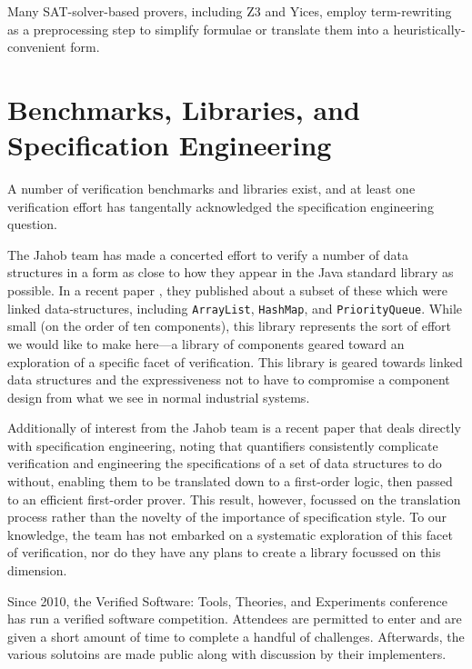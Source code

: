 Many SAT-solver-based provers, including Z3 and Yices, employ term-rewriting as a preprocessing step to simplify formulae or translate them into a heuristically-convenient form.

\section{Benchmarks, Libraries, and Specification Engineering}\label{sec:overviewEngineering}
A number of verification benchmarks and libraries exist, and at least one verification effort has tangentally acknowledged the specification engineering question.

The Jahob team has made a concerted effort to verify a number of data structures in a form as close to how they appear in the Java standard library as possible.  In a recent paper \cite{zee:annotations}, they published about a subset of these which were linked data-structures, including \texttt{ArrayList}, \texttt{HashMap}, and \texttt{PriorityQueue}.  While small (on the order of ten components), this library represents the sort of effort we would like to make here---a library of components geared toward an exploration of a specific facet of verification.  This library is geared towards linked data structures and the expressiveness not to have to compromise a component design from what we see in normal industrial systems.  

Additionally of interest from the Jahob team is a recent paper\cite{bouillaguetJahobFirstOrder} that deals directly with specification engineering, noting that quantifiers consistently complicate verification and engineering the specifications of a set of data structures to do without, enabling them to be translated down to a first-order logic, then passed to an efficient first-order prover.  This result, however, focussed on the translation process rather than the novelty of the importance of specification style.  To our knowledge, the team has not embarked on a systematic exploration of this facet of verification, nor do they have any plans to create a library focussed on this dimension.

Since 2010, the Verified Software: Tools, Theories, and Experiments conference has run a verified software competition.  Attendees are permitted to enter and are given a short amount of time to complete a handful of challenges.  Afterwards, the various solutoins are made public along with discussion by their implementers.

